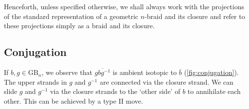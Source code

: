 \documentclass[oneside]{book}
\newcommand{\GB}{\text{GB}}
\theoremstyle{definition}
\begin{document}
	Henceforth, unless specified otherwise, we shall always work with the projections of the standard representation of a geometric \(n\)-braid and its closure and refer to these projections simply as a braid and its closure.

	\subsection{Conjugation}

	If \(b, g \in \GB_n\), we observe that \(\overline{g b g^{-1}}\) is ambient isotopic to \(\overline{b}\) (\cref{fig:conjugation}). The upper strands in \(g\) and \(g^{-1}\) are connected via the closure strand. We can slide \(g\) and \(g^{-1}\) via the closure strands to the `other side' of \(b\) to annihilate each other. This can be achieved by a type II move.
\end{document}

